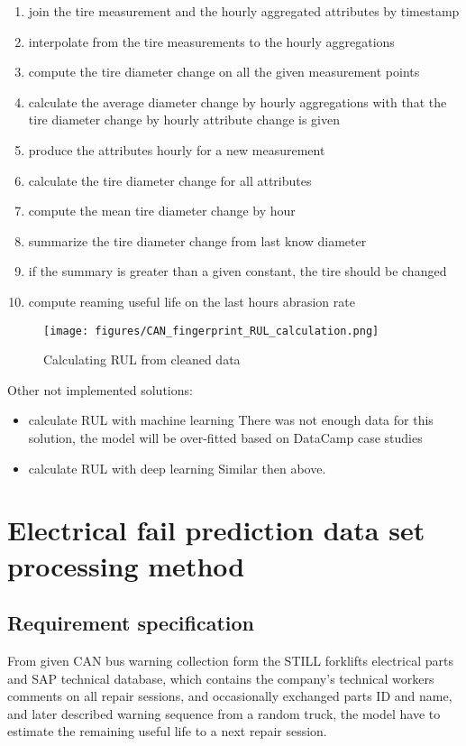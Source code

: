 	\begin{enumerate}
		\item{join the tire measurement and the hourly aggregated attributes by timestamp}
		\item{interpolate from the tire measurements to the hourly aggregations}
		\item{compute the tire diameter change on all the given measurement points}
		\item{calculate the average diameter change by hourly aggregations} with that the tire diameter change by hourly attribute change is given
		\item{produce the attributes hourly for a new measurement}
		\item{calculate the tire diameter change for all attributes}
		\item{compute the mean tire diameter change by hour}
		\item{summarize the tire diameter change from last know diameter}
		\item{if the summary is greater than a given constant, the tire should be changed}
		\item{compute reaming useful life on the last hours abrasion rate}
	\end{enumerate}
	\begin{figure}[!ht]
		\centering
		\texttt{[image: figures/CAN\_fingerprint\_RUL\_calculation.png]}
		\caption{Calculating RUL from cleaned data} 
	\end{figure}
		\noindent
	Other not implemented solutions:
	\begin{itemize}
		\item{calculate RUL with machine learning} There was not enough data for this solution, the model will be over-fitted based on DataCamp case studies \cite{DataCamp_CaseStudies} 
		\item{calculate RUL with deep learning} Similar then above.	
	\end{itemize}
	
\section{Electrical fail prediction data set processing method}
	\subsection{Requirement specification}
From given CAN bus warning collection form the STILL forklifts electrical parts and SAP technical database, which contains the company's technical workers comments on all repair sessions, and occasionally exchanged parts ID and name, and later described warning sequence from a random truck, the model have to estimate the remaining useful life to a next repair session.

